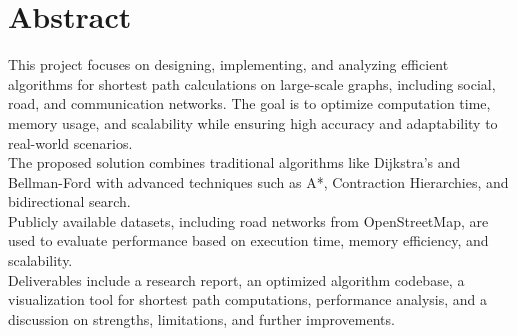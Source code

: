 \vspace{2in}
\chapter*{Abstract}


This project focuses on designing, implementing, and analyzing efficient algorithms for shortest path calculations on large-scale graphs, including social, road, and communication networks. The goal is to optimize computation time, memory usage, and scalability while ensuring high accuracy and adaptability to real-world scenarios. \\

The proposed solution combines traditional algorithms like Dijkstra’s and Bellman-Ford with advanced techniques such as A*, Contraction Hierarchies, and bidirectional search. \\

Publicly available datasets, including road networks from OpenStreetMap, are used to evaluate performance based on execution time, memory efficiency, and scalability. \\

Deliverables include a research report, an optimized algorithm codebase, a visualization tool for shortest path computations, performance analysis, and a discussion on strengths, limitations, and further improvements.
